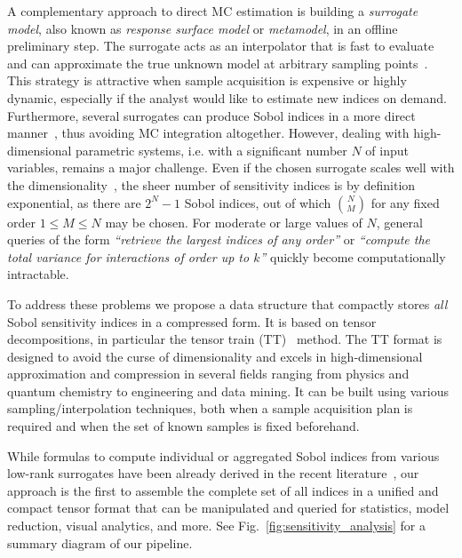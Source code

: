 \documentclass[review, twocolumn]{svjour3}          %
\begin{document}
A complementary approach to direct MC estimation is building a \emph{surrogate model}, also known as \emph{response surface model} or \emph{metamodel}, in an offline preliminary step. The surrogate acts as an interpolator that is fast to evaluate and can approximate the true unknown model at arbitrary sampling points~\cite{QHSGVT:05}. This strategy is attractive when sample acquisition is expensive or highly dynamic, especially if the analyst would like to estimate new indices on demand. Furthermore, several surrogates can produce Sobol indices in a more direct manner~\cite{IL:15}, thus avoiding MC integration altogether. However, dealing with high-dimensional parametric systems, i.e. with a significant number $N$ of input variables, remains a major challenge. Even if the chosen surrogate scales well with the dimensionality~\cite{KS:16}, the sheer number of sensitivity indices is by definition exponential, as there are $2^N-1$ Sobol indices, out of which $\binom{N}{M}$ for any fixed order $1 \le M \le N$ may be chosen. For moderate or large values of $N$, general queries of the form \emph{``retrieve the largest indices of any order''} or \emph{``compute the total variance for interactions of order up to $k$''}
quickly become computationally intractable.

To address these problems we propose a data structure that compactly stores \emph{all} Sobol sensitivity indices in a compressed form. It is based on tensor decompositions, in particular the tensor train (TT)~\cite{Oseledets:11} method. The TT format is designed to avoid the curse of dimensionality and excels in high-dimensional approximation and compression in several fields ranging from physics and quantum chemistry to engineering and data mining. It can be built using various sampling/interpolation techniques, both when a sample acquisition plan is required and when the set of known samples is fixed beforehand.

While formulas to compute individual or aggregated Sobol indices from various low-rank surrogates have been already derived in the recent literature~\cite{Rai:14, DKLM:14, KS:16}, our approach is the first to assemble the complete set of all indices in a unified and compact tensor format that can be manipulated and queried for statistics, model reduction, visual analytics, and more. See Fig.~\ref{fig:sensitivity_analysis} for a summary diagram of our pipeline.
\end{document}
